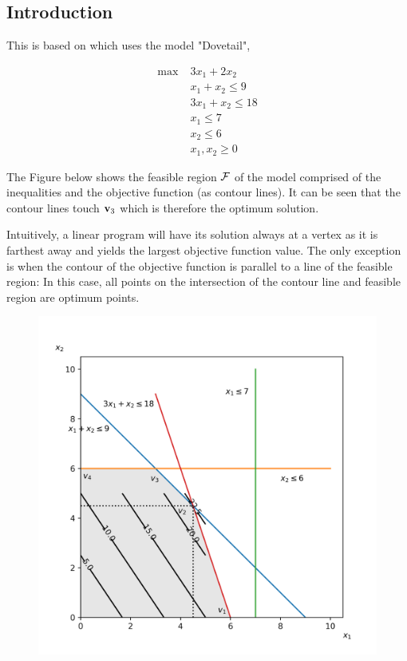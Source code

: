 
\subsection{Introduction}

This is based on \cite{Sierksma2015} which uses the model "Dovetail",

\begin{align*}
  \max \; & 3x_1 + 2x_2 \\
       & x_1 + x_2 \leq 9 \\
       & 3x_1 + x_2 \leq 18 \\
       & x_1 \leq 7 \\
       & x_2 \leq 6 \\
       & x_1, x_2 \geq 0
\end{align*}

The Figure below shows the feasible region $\mathcal{F}$ of the model comprised of the inequalities and the objective function (as contour lines). It can be seen that the contour lines touch $\mathbf{v}_3$ which is therefore the optimum solution.

Intuitively, a linear program will have its solution always at a vertex as it is farthest away and yields the largest objective function value. The only exception is when the contour of the objective function is parallel to a line of the feasible region: In this case, all points on the intersection of the contour line and feasible region are optimum points.

\begin{figure}[H]
\includegraphics[scale = 0.7]{images/2022-09-27_lin_prog_1_01.png}
\end{figure}


